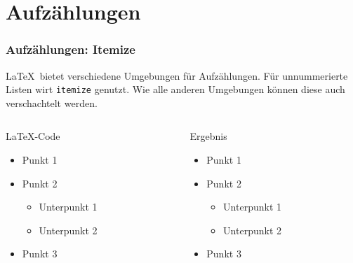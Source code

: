 \section{Aufzählungen}
\begin{frame}[fragile]
    \frametitle{Aufzählungen: Itemize}
    \LaTeX \ bietet verschiedene Umgebungen für Aufzählungen. Für unnummerierte Listen wirt \texttt{itemize} genutzt.
    Wie alle anderen Umgebungen können diese auch verschachtelt werden.
    \begin{columns}[t]
        \begin{column}{0.47\textwidth}
            \begin{block}{\LaTeX-Code}
                \begin{lstverbatim}
                \begin{itemize}
                    \item Punkt 1
                    \item Punkt 2
                        \begin{itemize}%
                            \item Unterpunkt 1
                            \item Unterpunkt 2
                        \end{itemize}
                    \item Punkt 3
                \end{itemize}
                \end{lstverbatim}
            \end{block}
        \end{column}
        \begin{column}{0.47\textwidth}
            \begin{block}{Ergebnis}
                \begin{itemize}
                    \item Punkt 1
                    \item Punkt 2
                        \begin{itemize}  %
                            \item Unterpunkt 1
                            \item Unterpunkt 2
                        \end{itemize}
                    \item Punkt 3
                \end{itemize}
            \end{block}
        \end{column}
    \end{columns}
\end{frame}

